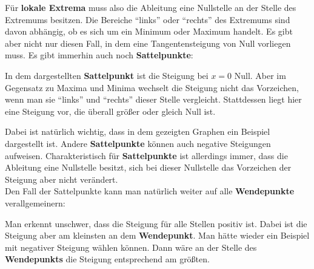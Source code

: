\documentclass[../../main.tex]{subfiles}
\begin{document}
    Für \textbf{lokale Extrema} muss also die Ableitung eine Nullstelle an der Stelle des Extremums besitzen. Die Bereiche \enquote{links} oder \enquote{rechts} des Extremums sind davon abhängig, ob es sich um ein Minimum oder Maximum handelt. Es gibt aber nicht nur diesen Fall, in dem eine Tangentensteigung von Null vorliegen muss. Es gibt immerhin auch noch \textbf{Sattelpunkte}:
    \begin{multicols}{2}
       In dem dargestellten \textbf{Sattelpunkt} ist die Steigung bei $x=0$ Null. Aber im Gegensatz zu Maxima und Minima wechselt die Steigung nicht das Vorzeichen, wenn man sie \enquote{links} und \enquote{rechts} dieser Stelle vergleicht. Stattdessen liegt hier eine Steigung vor, die überall größer oder gleich Null ist.
       
     \begin{center}\normalsize
             \end{center}
    \end{multicols}
    Dabei ist natürlich wichtig, dass in dem gezeigten Graphen ein Beispiel dargestellt ist. Andere \textbf{Sattelpunkte} können auch negative Steigungen aufweisen. Charakteristisch für \textbf{Sattelpunkte} ist allerdings immer, dass die Ableitung eine Nullstelle besitzt, sich bei dieser Nullstelle das Vorzeichen der Steigung aber nicht verändert.\\
    Den Fall der Sattelpunkte kann man natürlich weiter auf alle \textbf{Wendepunkte} verallgemeinern:
    \begin{multicols}{2}
       Man erkennt unschwer, dass die Steigung für alle Stellen positiv ist. Dabei ist die Steigung aber am kleinsten an dem \textbf{Wendepunkt}. Man hätte wieder ein Beispiel mit negativer Steigung wählen können. Dann wäre an der Stelle des \textbf{Wendepunkts} die Steigung entsprechend am größten.
     \begin{center}\normalsize
             \end{center}
    \end{multicols}
\end{document}
